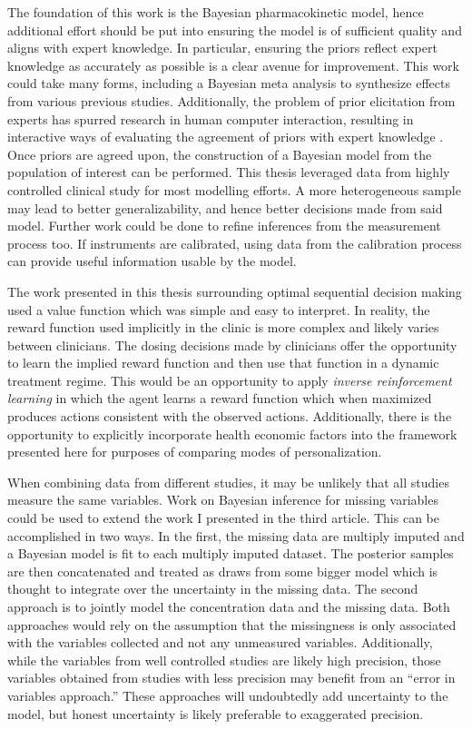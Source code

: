 The foundation of this work is the Bayesian pharmacokinetic model, hence additional effort should be put into ensuring the model is of sufficient quality and aligns with expert knowledge.  In particular, ensuring the priors reflect expert knowledge as accurately as possible is a clear avenue for improvement.  This work could take many forms, including a Bayesian meta analysis to synthesize effects from various previous studies.  Additionally, the problem of prior elicitation from experts has spurred research in human computer interaction, resulting in interactive ways of evaluating the agreement of priors with expert knowledge \cite{sarma2020prior}.  Once priors are agreed upon, the construction of a Bayesian model from the population of interest can be performed.  This thesis leveraged data from highly controlled clinical study for most modelling efforts.  A more heterogeneous sample may lead to better generalizability, and hence better decisions made from said model.  Further work could be done to refine inferences from the measurement process too.  If instruments are calibrated, using data from the calibration process can provide useful information usable by the model.

The work presented in this thesis surrounding optimal sequential decision making used a value function which was simple and easy to interpret.  In reality, the reward function used implicitly in the clinic is more complex and likely varies between clinicians.  The dosing decisions made by clinicians offer the opportunity to learn the implied reward function and then use that function in a dynamic treatment regime.  This would be an opportunity to apply \textit{inverse reinforcement learning} in which the agent learns a reward function which when maximized produces actions consistent with the observed actions.  Additionally, there is the opportunity to explicitly incorporate health economic factors into the  framework presented here for purposes of comparing modes of personalization.

When combining data from different studies, it may be unlikely that all studies measure the same variables.  Work on Bayesian inference for missing variables could be used to extend the work I presented in the third article. This can be accomplished in two ways.  In the first, the missing data are multiply imputed and a Bayesian model is fit to each multiply imputed dataset.  The posterior samples are then concatenated and treated as draws from some bigger model which is thought to integrate over the uncertainty in the missing data.  The second approach is to jointly model the concentration data and the missing data.  Both approaches would rely on the assumption that the missingness is only associated with the variables collected and not any unmeasured variables.  Additionally, while the variables from well controlled studies are likely high precision, those variables obtained from studies with less precision may benefit from an ``error in variables approach.'' These approaches will undoubtedly add uncertainty to the model, but honest uncertainty is likely preferable to exaggerated precision.

